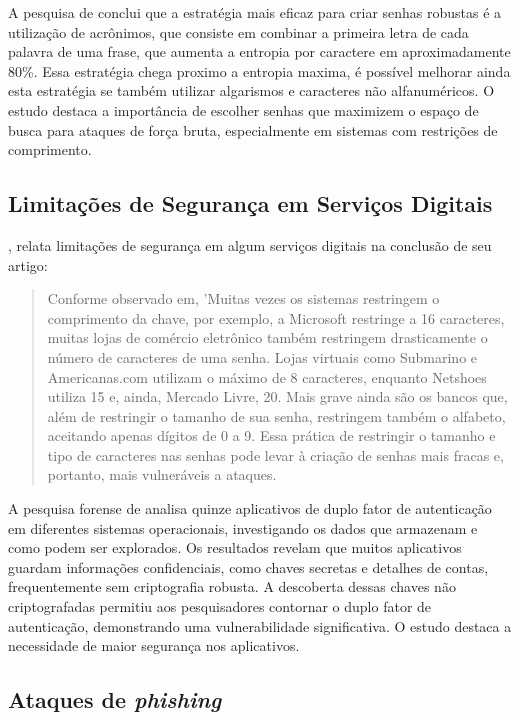 \documentclass[12pt]{article}
\begin{document}
A pesquisa de \cite{article:1} conclui que a estratégia mais eficaz para criar senhas
robustas é a utilização de acrônimos, que consiste em combinar a primeira letra de
cada palavra de uma frase, que aumenta a entropia por caractere em aproximadamente 80\%.
Essa estratégia chega proximo a entropia maxima, é possível melhorar ainda esta
estratégia se também utilizar algarismos e caracteres não alfanuméricos.
O estudo destaca a importância de escolher senhas que maximizem o espaço
de busca para ataques de força bruta, especialmente em sistemas com
restrições de comprimento.

\subsection{Limitações de Segurança em Serviços Digitais}

\cite{article:1}, relata limitações de segurança em algum serviços
digitais na conclusão de seu artigo:

\begin{quote}
  \small
  \linespread{1.0}
  \selectfont
  Conforme observado em, 'Muitas vezes os sistemas restringem o comprimento da chave, por exemplo, a
  Microsoft restringe a 16 caracteres, muitas lojas de comércio eletrônico também restringem drasticamente o
  número de caracteres de uma senha. Lojas virtuais como Submarino e Americanas.com utilizam o máximo de 8
  caracteres, enquanto Netshoes utiliza 15 e, ainda, Mercado Livre, 20. Mais grave ainda são os bancos que,
  além de restringir o tamanho de sua senha, restringem também o alfabeto, aceitando apenas dígitos de 0 a 9.
  Essa prática de restringir o tamanho e tipo de caracteres nas senhas pode levar à criação de senhas mais
  fracas e, portanto, mais vulneráveis a ataques.
  \cite{article:1}
\end{quote}

A pesquisa forense de \cite{article:2} analisa quinze aplicativos de duplo fator de
autenticação em diferentes sistemas operacionais, investigando os dados que armazenam
e como podem ser explorados.
Os resultados revelam que muitos aplicativos guardam informações confidenciais, como
chaves secretas e detalhes de contas, frequentemente sem criptografia robusta.
A descoberta dessas chaves não criptografadas permitiu aos pesquisadores contornar o 
duplo fator de autenticação, demonstrando uma vulnerabilidade significativa.
O estudo destaca a necessidade de maior segurança nos aplicativos.

\subsection{Ataques de \textit{phishing}}
\end{document}
